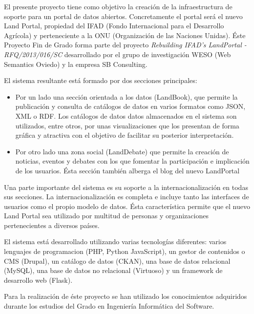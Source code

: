 El presente proyecto tiene como objetivo la creación de la infraestructura de
soporte  para un portal de datos abiertos.  Concretamente
el portal será el nuevo Land Portal, propiedad del IFAD (Fondo Internacional para
el Desarrollo Agrícola) y perteneciente a la ONU (Organización de las Naciones
Unidas).  Éste Proyecto Fin de Grado forma parte del proyecto \textit{Rebuilding
IFAD's LandPortal - RFQ/2013/016/SC} desarrollado por el grupo de investigación
WESO (Web Semantics Oviedo) y la empresa SB Consulting.

El sistema resultante está formado por dos secciones principales:
\begin{itemize}
	\item
		Por un lado una sección orientada a los datos (LandBook), que permite
		la publicación y consulta de catálogos de datos en varios formatos
		como JSON, XML o RDF.  Los catálogos de datos datos almacenados en el
		sistema son utilizados, entre otros, por unas visualizaciones que los
		presentan de forma gráfica y atractiva con el objetivo de facilitar su
		posterior interpretación.
	\item
		Por otro lado una zona social (LandDebate) que permite la creación de
		noticias, eventos y debates con los que fomentar la participación e
		implicación de los usuarios.  Ésta sección también alberga el blog
		del nuevo LandPortal
	
\end{itemize}

Una parte importante del sistema es su soporte a la internacionalización en todas 
sus secciones.  La internacionalización es completa e incluye tanto las interfaces
de usuarios como el propio modelo de datos.  Ésta característica permite que el
nuevo Land Portal sea utilizado por multitud de personas y organizaciones
pertenecientes a diversos países.

El sistema está desarrollado utilizando varias tecnologías diferentes: varios lenguajes
de programacion (PHP, Python JavaScript), un gestor de contenidos o CMS (Drupal),
un catálogo de datos (CKAN), una base de datos relacional (MySQL), una base de
datos no relacional (Virtuoso) y un framework de desarrollo web (Flask).

Para la realización de éste proyecto se han utilizado los conocimientos adquiridos
durante los estudios del Grado en Ingeniería Informática del Software.